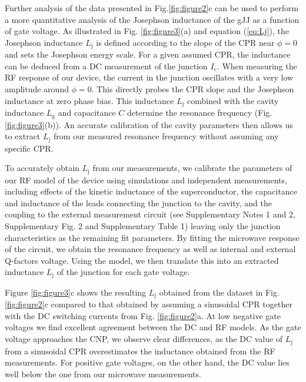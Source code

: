 Further analysis of the data presented in Fig.\ref{fig:figure2}c can be used to perform a more quantitative analysis of the Josephson inductance of the gJJ as a function of gate voltage.
As illustrated in Fig. \ref{fig:figure3}(a) and equation (\ref{eq:Lj}), the Josephson inductance $L_\textrm{j}$ is defined according to the slope of the CPR near $\phi=0$ and sets the Josephson energy scale.
For a given assumed CPR, the inductance can be deduced from a DC measurement of the junction $I_\textrm{c}$.
When measuring the RF response of our device, the current in the junction oscillates with a very low amplitude around $\phi=0$.
This directly probes the CPR slope and the Josephson inductance at zero phase bias.
This inductance $L_\textrm{j}$ combined with the cavity inductance $L_\textrm{g}$ and capacitance $C$ determine the resonance frequency (Fig. \ref{fig:figure3}(b)).
An accurate calibration of the cavity parameters then allows us to extract $L_\textrm{j}$ from our measured resonance frequency without assuming any specific CPR.

To accurately obtain $L_\textrm{j}$ from our measurements, we calibrate the parameters of our RF model of the device using simulations and independent measurements, including effects of the kinetic inductance of the superconductor, the capacitance and inductance of the leads connecting the junction to the cavity, and the coupling to the external measurement circuit (see Supplementary Notes 1 and 2, Supplementary Fig. 2 and Supplementary Table 1) leaving only the junction characteristics as the remaining fit parameters.
By fitting the microwave response of the circuit, we obtain the resonance frequency as well as internal and external Q-factors voltage.
Using the model, we then translate this into an extracted inductance $L_\textrm{j}$ of the junction for each gate voltage.

Figure \ref{fig:figure3}c shows the resulting $L_\textrm{j}$ obtained from the dataset in Fig. \ref{fig:figure2}c compared to that obtained by assuming a sinusoidal CPR together with the DC switching currents from Fig. \ref{fig:figure2}a.
At low negative gate voltages we find excellent agreement between the DC and RF models.
As the gate voltage approaches the CNP, we observe clear differences, as the DC value of $L_\textrm{j}$ from a sinusoidal CPR overestimates the inductance obtained from the RF measurements.
For positive gate voltages, on the other hand, the DC value lies well below the one from our microwave measurements.

